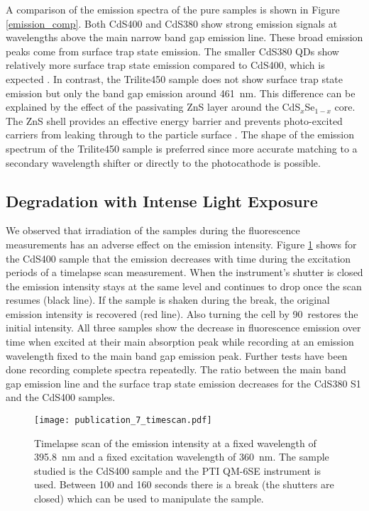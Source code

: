 \documentclass[cits]{JINST}
\begin{document}
A comparison of the emission spectra of the pure samples is shown in Figure \ref{emission_comp}. Both CdS400 and CdS380 show strong emission signals at wavelengths above the main narrow band gap emission line. These broad emission peaks come from surface trap state emission. The smaller CdS380 QDs show relatively more surface trap state emission compared to CdS400, which is expected \cite{capek}. In contrast, the Trilite450 sample does not show surface trap state emission but only the band gap emission around 461~nm. This difference can be explained by the effect of the passivating ZnS layer around the CdS$_x$Se$_{1-x}$ core. The ZnS shell provides an effective energy barrier and prevents photo-excited carriers from leaking through to the particle surface \cite{dabbousi1997}. The shape of the emission spectrum of the Trilite450 sample is preferred since more accurate matching to a secondary wavelength shifter or directly to the photocathode is possible.

\subsection{Degradation with Intense Light Exposure}
We observed that irradiation of the samples during the fluorescence measurements has an adverse effect on the emission intensity. Figure \ref{time_scan} shows for the CdS400 sample that the emission decreases with time during the excitation periods of a timelapse scan measurement. When the instrument's shutter is closed the emission intensity stays at the same level and continues to drop once the scan resumes (black line). If the sample is shaken during the break, the original emission intensity is recovered (red line). Also turning the cell by 90\textdegree ~restores the initial intensity. All three samples show the decrease in fluorescence emission over time when excited at their main absorption peak while recording at an emission wavelength fixed to the main band gap emission peak. Further tests have been done recording complete spectra repeatedly. The ratio between the main band gap emission line and the surface trap state emission decreases for the CdS380 S1 and the CdS400 samples. 

\begin{figure}[tbh]
      \begin{center}
        \texttt{[image: publication\_7\_timescan.pdf]}
        \caption[]{Timelapse scan of the emission intensity at a fixed wavelength of 395.8~nm and a fixed excitation wavelength of 360~nm. The sample studied is the CdS400 sample and the PTI QM-6SE instrument is used. Between 100 and 160 seconds there is a break (the shutters are closed) which can be used to manipulate the sample. \label{time_scan}}
        \end{center}
\end{figure}
\end{document}
